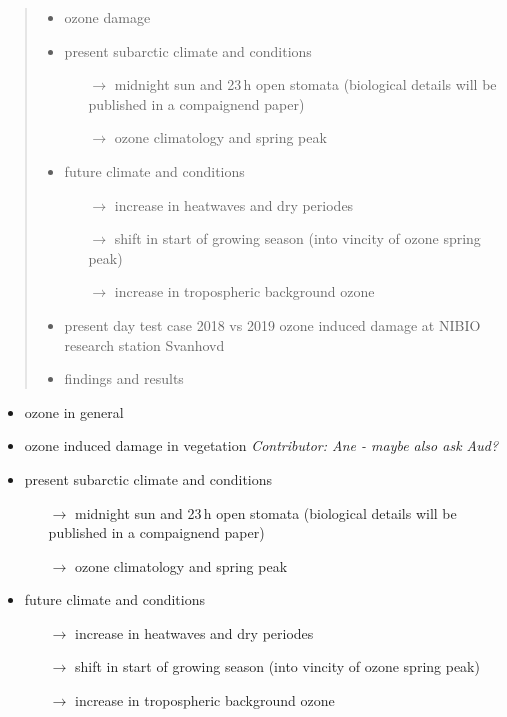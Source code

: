 \documentclass[bg, manuscript]{copernicus}
\begin{document}
\begin{abstract}
  \begin{itemize}
  \item ozone damage
  \item present subarctic climate and conditions
    \begin{itemize}
    \item[$\rightarrow$] midnight sun and 23\,\unit{h} open stomata (biological details will be published in a compaignend paper)
    \item[$\rightarrow$] ozone climatology and spring peak
    \end{itemize}
  \item future climate and conditions
    \begin{itemize}
    \item[$\rightarrow$] increase in heatwaves and dry periodes
    \item[$\rightarrow$] shift in start of growing season (into vincity of ozone spring peak)
    \item[$\rightarrow$] increase in tropospheric background ozone
    \end{itemize}
  \item present day test case 2018 vs 2019 ozone induced damage at NIBIO research station Svanhovd
  \item findings and results 
  \end{itemize}
\end{abstract}




\introduction  %
\label{sec:intro}
\begin{itemize}
\item ozone in general
\item ozone induced damage in vegetation \emph{Contributor: Ane - maybe also ask Aud?}
\item present subarctic climate and conditions
  \begin{itemize}
  \item[$\rightarrow$] midnight sun and 23\,\unit{h} open stomata (biological details will be published in a compaignend paper)
  \item[$\rightarrow$] ozone climatology and spring peak
  \end{itemize}
\item future climate and conditions
  \begin{itemize}
  \item[$\rightarrow$] increase in heatwaves and dry periodes
  \item[$\rightarrow$] shift in start of growing season (into vincity of ozone spring peak)
  \item[$\rightarrow$] increase in tropospheric background ozone
  \end{itemize}
\end{itemize}
\end{document}
